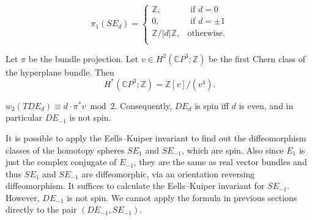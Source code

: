 \documentclass[twoside]{article}
\begin{document}
\begin{lem}
	\[
	\pi_1(SE_d) = \left \{ 
	\begin{array}{ll}
	\mathbb{Z}, & \text { if } d = 0 \\
	0, & \text { if } d = \pm 1\\
	\mathbb{Z}/|d|\mathbb{Z}, 
	& \text{otherwise.}\\
	\end{array}\right. 
	\]
\end{lem}




Let $\pi$ be the bundle projection.  Let $v\in H^2(\mathbb{C}P^3;\mathbb{Z})$ be the first Chern class of the hyperplane bundle. Then 
\[
H^*(\mathbb{C}P^3;\mathbb{Z}) = \mathbb{Z}[v]/(v^4). 
\]

\begin{lem}
	$w_2(TDE_{d}) \equiv  d\cdot\pi^*v \bmod 2$. Consequently, $DE_{d}$ is spin iff $d$ is even, and in particular $DE_{-1}$ is not spin. 
\end{lem}

It is possible to apply the Eells--Kuiper invariant to find out the diffeomorphism classes of the homotopy spheres $SE_1$ and $SE_{-1}$, which are spin. Also since $E_1$ is just the complex conjugate of $E_{-1}$, they are the same as real vector bundles and thus $SE_1$ and $SE_{-1}$ are diffeomorphic, via an orientation reversing diffeomorphism. It suffices to calculate the Eells--Kuiper invariant for $SE_{-1}$. However, $DE_{-1}$ is not spin. We cannot apply the formula in previous sections directly to the pair $(DE_{-1},SE_{-1})$. 
\end{document}
